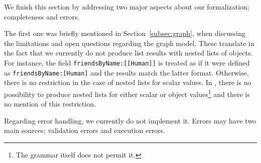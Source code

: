 We finish this section by addressing two major aspects about our formalization; completeness and errors.

The first one was briefly mentioned in Section~\ref{subsec:graph}, when discussing the limitations and open questions regarding the graph model. These translate in the fact that we currently do not produce list results with nested lists of objects. For instance, the field \texttt{friendsByName:[[Human]]} is treated as if it were defined as \texttt{friendsByName:[Human]} and the results match the latter format. Otherwise, there is no restriction in the case of nested lists for scalar values. In \HP{}, there is no possibility to produce nested lists for either scalar or object values\footnote{The grammar itself does not permit it.} and there is no mention of this restriction.

Regarding error handling, we currently do not implement it. Errors may have two main sources; validation errors and execution errors.
